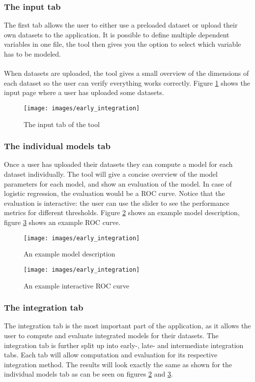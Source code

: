 \subsubsection{The input tab}
The first tab allows the user to either use a preloaded dataset or upload their own datasets to the application. It is possible to define multiple dependent variables in one file, the tool then gives you the option to select which variable has to be modeled. \\ \\
When datasets are uploaded, the tool gives a small overview of the dimensions of each dataset so the user can verify everything works correctly. Figure \ref{fig:tool-input} shows the input page where a user has uploaded some datasets.
\begin{figure}
	\centering
	\texttt{[image: images/early\_integration]}
	\caption{The input tab of the tool}
	\label{fig:tool-input}
\end{figure}
\subsubsection{The individual models tab}
Once a user has uploaded their datasets they can compute a model for each dataset individually. The tool will give a concise overview of the model parameters for each model, and show an evaluation of the model. In case of logistic regression, the evaluation would be a ROC curve. Notice that the evaluation is interactive: the user can use the slider to see the performance metrics for different thresholds. Figure \ref{fig:tool-model} shows an example model description, figure \ref{fig:tool-roc} shows an example ROC curve.
\begin{figure}
	\centering
	\texttt{[image: images/early\_integration]}
	\caption{An example model description}
	\label{fig:tool-model}
\end{figure}
\begin{figure}
	\centering
	\texttt{[image: images/early\_integration]}
	\caption{An example interactive ROC curve}
	\label{fig:tool-roc}
\end{figure}
\subsubsection{The integration tab}
The integration tab is the most important part of the application, as it allows the user to compute and evaluate integrated models for their datasets. The integration tab is further split up into early-, late- and intermediate integration tabs. Each tab will allow computation and evaluation for its respective integration method. The results will look exactly the same as shown for the individual models tab as can be seen on figures \ref{fig:tool-model} and \ref{fig:tool-roc}.

